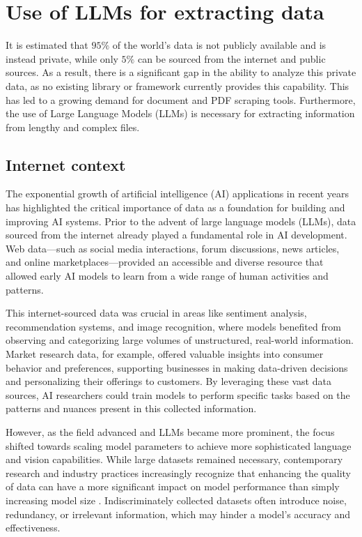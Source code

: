 \section{Use of LLMs for extracting data}
It is estimated that $95\%$ of the world's data is not publicly available and is instead private, while only $5\%$ can be sourced from the internet and public sources. As a result, there is a significant gap in the ability to analyze this private data, as no existing library or framework currently provides this capability. This has led to a growing demand for document and PDF scraping tools. Furthermore, the use of Large Language Models (LLMs) is necessary for extracting information from lengthy and complex files.

\subsection{Internet context}
The exponential growth of artificial intelligence (AI) applications in recent years has highlighted the critical importance of data as a foundation for building and improving AI systems. Prior to the advent of large language models (LLMs), data sourced from the internet already played a fundamental role in AI development. Web data—such as social media interactions, forum discussions, news articles, and online marketplaces—provided an accessible and diverse resource that allowed early AI models to learn from a wide range of human activities and patterns.

This internet-sourced data was crucial in areas like sentiment analysis, recommendation systems, and image recognition, where models benefited from observing and categorizing large volumes of unstructured, real-world information. Market research data, for example, offered valuable insights into consumer behavior and preferences, supporting businesses in making data-driven decisions and personalizing their offerings to customers. By leveraging these vast data sources, AI researchers could train models to perform specific tasks based on the patterns and nuances present in this collected information.

However, as the field advanced and LLMs became more prominent, the focus shifted towards scaling model parameters to achieve more sophisticated language and vision capabilities. While large datasets remained necessary, contemporary research and industry practices increasingly recognize that enhancing the quality of data can have a more significant impact on model performance than simply increasing model size \cite{12}. Indiscriminately collected datasets often introduce noise, redundancy, or irrelevant information, which may hinder a model’s accuracy and effectiveness.


